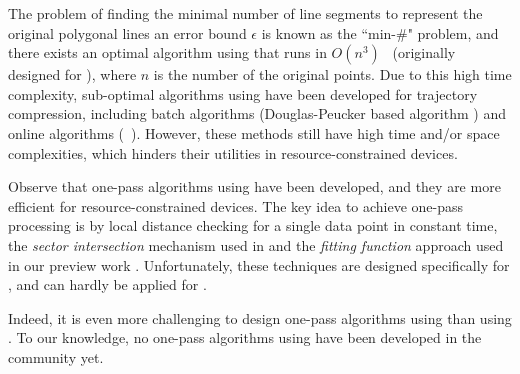 %
%

The problem of finding the minimal number of line segments to represent the original polygonal lines \wrt an error bound $\epsilon$ is known as the ``min-\#" problem\cite{Imai:Optimal,Chan:Optimal}, and there exists an optimal \lsa algorithm using \sed that runs in $O(n^3)$~\cite{Imai:Optimal} (originally designed for \ped ),  where $n$ is the number of the original points.
Due to this high time complexity, sub-optimal \lsa algorithms using \sed have been developed for trajectory compression, including batch algorithms (\eg Douglas-Peucker based algorithm \dpsed \cite{Meratnia:Spatiotemporal}) and online algorithms (\eg\ \squishe \cite{Muckell:Compression}).
However, these methods still have high time and/or space complexities, which hinders their utilities in resource-constrained devices. %


Observe that one-pass \lsa algorithms using \ped \cite{Williams:Longest, Sklansky:Cone, Dunham:Cone, Zhao:Sleeve, Lin:Operb} have been developed, and they are more efficient for resource-constrained devices.
%
The key idea to achieve one-pass processing is by local distance checking for a single data point in constant time, \eg the \textit{sector intersection} mechanism used in \cite{Williams:Longest, Sklansky:Cone, Dunham:Cone, Zhao:Sleeve} and the \textit{fitting function} approach used in our preview work \cite {Lin:Operb}.
Unfortunately, these techniques are designed specifically for \ped, and can hardly be applied for \sed.


Indeed, it is even more challenging to design one-pass \lsa algorithms using \sed than using \ped.
To our knowledge,  no one-pass \lsa algorithms using \sed have been developed in the community yet.



